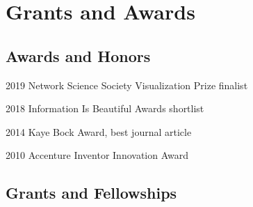 \documentclass[12pt,letterpaper]{report}
\begin{document}
    \section*{Grants and Awards}

    \subsection*{Awards and Honors}

    \begin{tablist}

        \item[2019] \tab Network Science Society Visualization Prize finalist

        \item[2018] \tab Information Is Beautiful Awards shortlist

        \item[2014] \tab Kaye Bock Award, best journal article

        \item[2010] \tab Accenture Inventor Innovation Award

    \end{tablist}

    \subsection*{Grants and Fellowships}
\end{document}
